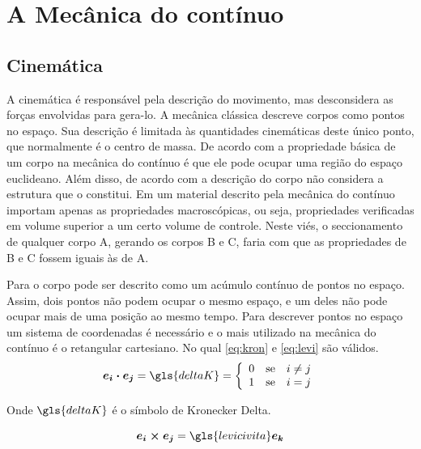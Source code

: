 \chapter{A Mecânica do contínuo} \label{Cap:MecCont}

\section{Cinemática}
A cinemática é responsável pela descrição do movimento, mas desconsidera as forças envolvidas para gera-lo. A mecânica clássica descreve corpos como pontos no espaço. Sua descrição é limitada às quantidades cinemáticas deste único ponto, que normalmente é o centro de massa. De acordo com \cite{gurtin_fried_anand_2013} a propriedade básica de um corpo na mecânica do contínuo é que ele pode ocupar uma região do espaço euclideano. Além disso, de acordo com \cite{tadmor_miller_elliott_2012} a descrição do corpo não considera a estrutura que o constitui. Em um material descrito pela mecânica do contínuo importam apenas as propriedades macroscópicas, ou seja, propriedades verificadas em volume superior a um certo volume de controle. Neste viés, o seccionamento de qualquer corpo A, gerando os corpos B e C, faria com que as propriedades de B e C fossem iguais às de A.\par

Para \cite{hiermaier_2008} o corpo pode ser descrito como um acúmulo contínuo de pontos no espaço. Assim, dois pontos não podem ocupar o mesmo espaço, e um deles não pode ocupar mais de uma posição ao mesmo tempo. Para descrever pontos no espaço um sistema de coordenadas é necessário e o mais utilizado na mecânica do contínuo é o retangular cartesiano. No qual \ref{eq:kron} e \ref{eq:levi} são válidos. 
\begin{equation} \label{eq:kron}
    \boldsymbol{e_i \cdot e_j} = \gls{deltaK} = \left \{ \begin{array}{rcl}
       0  & \mbox{se} & i \neq j  \\
       1  & \mbox{se} & i = j
    \end{array} \right.
\end{equation}

Onde $ \gls{deltaK} $ é o símbolo de Kronecker Delta.

\begin{equation} \label{eq:levi}
    \boldsymbol{e_i \times e_j} = \gls{levicivita}\boldsymbol{e_k}
\end{equation}

